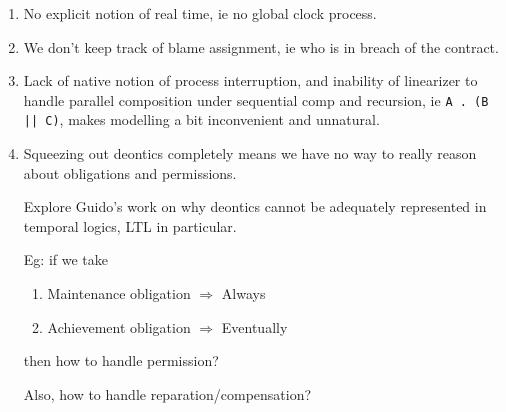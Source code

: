 \documentclass{article}
\begin{document}
\begin{enumerate}
  \item No explicit notion of real time, ie no global clock process.

  \item We don't keep track of blame assignment, ie who is in breach of the
  contract.

  \item Lack of native notion of process interruption, and inability of
  linearizer to handle parallel composition under sequential comp and recursion,
  ie \texttt{A . (B || C)}, makes modelling a bit inconvenient and unnatural.

  \item Squeezing out deontics completely means we have no way to really reason
  about obligations and permissions.

  Explore Guido's work on why deontics cannot be adequately represented in
  temporal logics, LTL in particular.

  Eg: if we take
  \begin{enumerate}
    \item Maintenance obligation $\Rightarrow$ Always
    \item Achievement obligation $\Rightarrow$ Eventually
  \end{enumerate}
  then how to handle permission?

  Also, how to handle reparation/compensation?
\end{enumerate}






\newpage



\end{document}

